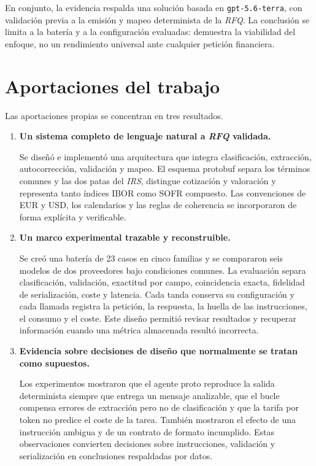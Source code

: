 En conjunto, la evidencia respalda una solución basada en \texttt{gpt-5.6-terra}, con validación previa a la emisión y mapeo determinista de la \textit{RFQ}. La conclusión se limita a la batería y a la configuración evaluadas: demuestra la viabilidad del enfoque, no un rendimiento universal ante cualquier petición financiera.

\section{Aportaciones del trabajo}
\label{sec:aportaciones_trabajo}

Las aportaciones propias se concentran en tres resultados.

\begin{enumerate}
    \item \textbf{Un sistema completo de lenguaje natural a \textit{RFQ} validada.}

    Se diseñó e implementó una arquitectura que integra clasificación, extracción, autocorrección, validación y mapeo. El esquema protobuf separa los términos comunes y las dos patas del \textit{IRS}, distingue cotización y valoración y representa tanto índices IBOR como SOFR compuesto. Las convenciones de EUR y USD, los calendarios y las reglas de coherencia se incorporaron de forma explícita y verificable.

    \item \textbf{Un marco experimental trazable y reconstruible.}

    Se creó una batería de 23 casos en cinco familias y se compararon seis modelos de dos proveedores bajo condiciones comunes. La evaluación separa clasificación, validación, exactitud por campo, coincidencia exacta, fidelidad de serialización, coste y latencia. Cada tanda conserva su configuración y cada llamada registra la petición, la respuesta, la huella de las instrucciones, el consumo y el coste. Este diseño permitió revisar resultados y recuperar información cuando una métrica almacenada resultó incorrecta.

    \item \textbf{Evidencia sobre decisiones de diseño que normalmente se tratan como supuestos.}

    Los experimentos mostraron que el agente proto reproduce la salida determinista siempre que entrega un mensaje analizable, que el bucle compensa errores de extracción pero no de clasificación y que la tarifa por token no predice el coste de la tarea. También mostraron el efecto de una instrucción ambigua y de un contrato de formato incumplido. Estas observaciones convierten decisiones sobre instrucciones, validación y serialización en conclusiones respaldadas por datos.
\end{enumerate}

